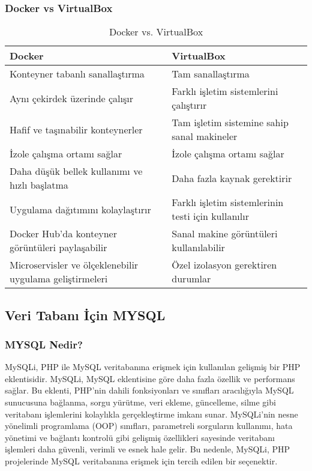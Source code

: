 \subsubsection{Docker vs VirtualBox}
\begin{table}[!h]
  \centering
  \begin{tabular}{|p{}|p{}|}
    \hline
    \textbf{Docker} & \textbf{VirtualBox} \\
    \hline
    Konteyner tabanlı sanallaştırma & Tam sanallaştırma \\
    \hline
    Aynı çekirdek üzerinde çalışır & Farklı işletim sistemlerini çalıştırır \\
    \hline
    Hafif ve taşınabilir konteynerler & Tam işletim sistemine sahip sanal makineler \\
    \hline
    İzole çalışma ortamı sağlar & İzole çalışma ortamı sağlar \\
    \hline
    Daha düşük bellek kullanımı ve hızlı başlatma & Daha fazla kaynak gerektirir \\
    \hline
    Uygulama dağıtımını kolaylaştırır & Farklı işletim sistemlerinin testi için kullanılır \\
    \hline
    Docker Hub'da konteyner görüntüleri paylaşabilir & Sanal makine görüntüleri kullanılabilir \\
    \hline
    Microservisler ve ölçeklenebilir uygulama geliştirmeleri & Özel izolasyon gerektiren durumlar \\
    \hline
  \end{tabular}
  \caption{Docker vs. VirtualBox}
  \label{tab:docker-virtualbox}
\end{table}
\subsection{Veri Tabanı İçin \textbf{MYSQL }}
\subsubsection{MYSQL Nedir?}
MySQLi, PHP ile MySQL veritabanına erişmek için kullanılan gelişmiş bir PHP eklentisidir. MySQLi, MySQL eklentisine göre daha fazla özellik ve performans sağlar. Bu eklenti, PHP'nin dahili fonksiyonları ve sınıfları aracılığıyla MySQL sunucusuna bağlanma, sorgu yürütme, veri ekleme, güncelleme, silme gibi veritabanı işlemlerini kolaylıkla gerçekleştirme imkanı sunar. MySQLi'nin nesne yönelimli programlama (OOP) sınıfları, parametreli sorguların kullanımı, hata yönetimi ve bağlantı kontrolü gibi gelişmiş özellikleri sayesinde veritabanı işlemleri daha güvenli, verimli ve esnek hale gelir. Bu nedenle, MySQLi, PHP projelerinde MySQL veritabanına erişmek için tercih edilen bir seçenektir.

